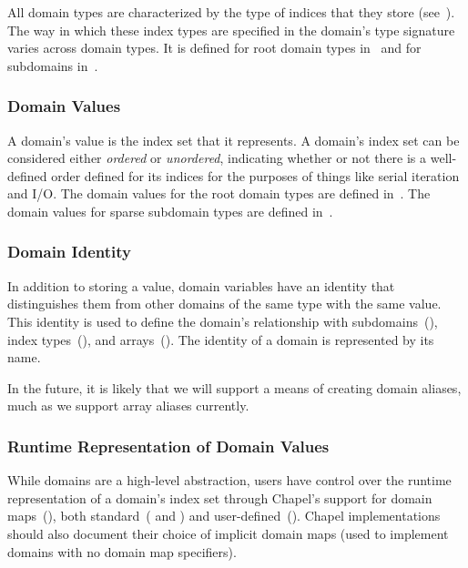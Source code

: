 All domain types are characterized by the type of indices that they
store (see~).  The way in which these index types
are specified in the domain's type signature varies across domain
types.  It is defined for root domain types
in~ and for subdomains
in~.

\subsubsection{Domain Values}
\label{Domain_Values}

A domain's value is the index set that it represents.  A domain's
index set can be considered either \emph{ordered} or \emph{unordered},
indicating whether or not there is a well-defined order defined for
its indices for the purposes of things like serial iteration and I/O.
The domain values for the root domain types are defined
in~.  The domain values for sparse subdomain types
are defined in~.

\subsubsection{Domain Identity}
\label{Domain_Identity}

In addition to storing a value, domain variables have an identity that
distinguishes them from other domains of the same type with the same
value.  This identity is used to define the domain's relationship
with subdomains~(), index types~(),
and arrays~().  The identity of
a domain is represented by its name.

\begin{openissue}
In the future, it is likely that we will support a means of creating
domain aliases, much as we support array aliases currently.
\end{openissue}

\subsubsection{Runtime Representation of Domain Values}
\label{Domain_Runtime_Representation}

While domains are a high-level abstraction, users have control over
the runtime representation of a domain's index set through Chapel's
support for domain maps~(), both
standard~( and )
and user-defined~().  Chapel
implementations should also document their choice of implicit domain
maps (used to implement domains with no domain map specifiers).


